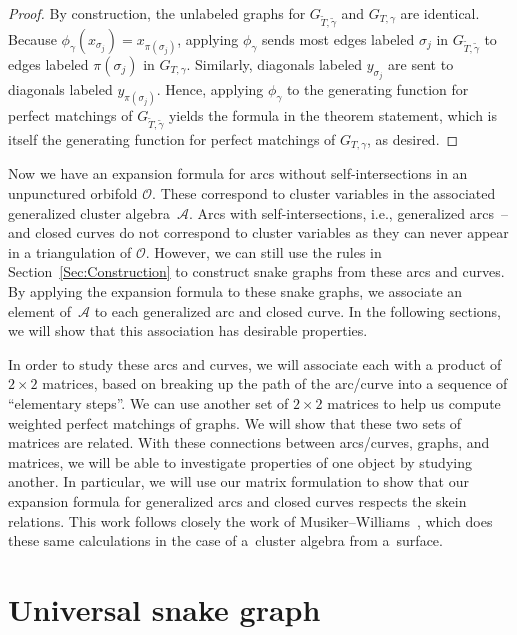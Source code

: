 \begin{proof}
By construction, the unlabeled graphs for $G_{\widetilde{T},\widetilde{\gamma}}$ and $G_{T,\gamma}$ are identical. Because $\phi_\gamma(x_{\sigma_j}) = x_{\pi(\sigma_j)}$,
applying $\phi_\gamma$ sends most edges labeled $\sigma_j$ in $G_{\widetilde{T},\widetilde{\gamma}}$ to edges labeled $\pi(\sigma_j)$ in $G_{T,\gamma}$. Similarly, diagonals labeled $y_{\sigma_j}$ are sent to diagonals labeled $y_{\pi(\sigma_j)}$. Hence, applying $\phi_\gamma$ to the generating function for perfect matchings of $G_{\widetilde{T},\widetilde{\gamma}}$ yields the formula in the theorem statement, which is itself the generating function for perfect matchings of $G_{T,\gamma}$, as desired.
 \end{proof}

Now we have an expansion formula for arcs without self-intersections in an unpunctured orbifold $\mathcal{O}$. These correspond to cluster variables in the associated generalized cluster algebra~$\mathcal{A}$. Arcs with self-intersections, i.e., generalized arcs~-- and closed curves do not correspond to cluster variables as they can never appear in a triangulation of $\mathcal{O}$. However, we can still use the rules in Section~\ref{Sec:Construction} to construct snake graphs from these arcs and curves. By applying the expansion formula to these snake graphs, we associate an element of~$\mathcal{A}$ to each generalized arc and closed curve. In the following sections, we will show that this association has desirable properties.

In order to study these arcs and curves, we will associate each with a product of $2\times 2$ matrices, based on breaking up the path of the arc/curve into a sequence of ``elementary steps''. We can use another set of $2\times 2$ matrices to help us compute weighted perfect matchings of graphs. We will show that these two sets of matrices are related. With these connections between arcs/curves, graphs, and matrices, we will be able to investigate properties of one object by studying another. In particular, we will use our matrix formulation to show that our expansion formula for generalized arcs and closed curves respects the skein relations. This work follows closely the work of Musiker--Williams~\cite{MW}, which does these same calculations in the case of a~cluster algebra from a~surface.

\section{Universal snake graph}\label{sec:universalSnakeGraph}

